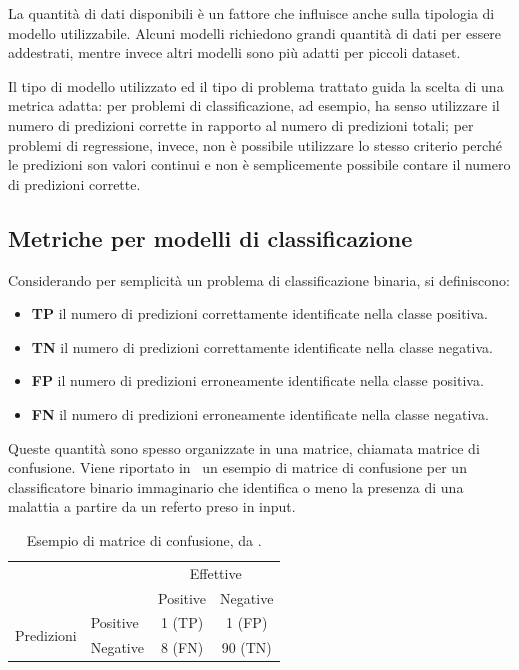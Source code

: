 La quantità di dati disponibili è un fattore che influisce anche sulla tipologia di modello utilizzabile.
Alcuni modelli richiedono grandi quantità di dati per essere addestrati, mentre invece altri modelli sono più adatti per piccoli dataset. 

Il tipo di modello utilizzato ed il tipo di problema trattato guida la scelta di una metrica adatta: per problemi di classificazione, ad esempio, ha senso utilizzare il numero di predizioni corrette in rapporto al numero di predizioni totali; per problemi di regressione, invece, non è possibile utilizzare lo stesso criterio perché le predizioni son valori continui e non è semplicemente possibile contare il numero di predizioni corrette. 

\subsection{Metriche per modelli di classificazione}\label{sec:metriche_valutazione_modelli}
Considerando per semplicità un problema di classificazione binaria, si definiscono:
\begin{itemize}
    \item \textbf{TP} il numero di predizioni correttamente identificate nella classe positiva.
    \item \textbf{TN} il numero di predizioni correttamente identificate nella classe negativa.
    \item \textbf{FP} il numero di predizioni erroneamente identificate nella classe positiva.
    \item \textbf{FN} il numero di predizioni erroneamente identificate nella classe negativa.
\end{itemize}
Queste quantità sono spesso organizzate in una matrice, chiamata matrice di confusione.
Viene riportato in~ un esempio di matrice di confusione per un classificatore binario immaginario che identifica o meno la presenza di una malattia a partire da un referto preso in input.
\begin{table}[h]
    \centering
    \begin{tabular}{l|l|c|c|}
        \multicolumn{2}{c}{}&\multicolumn{2}{c}{Effettive}\\
        \cline{3-4}
        \multicolumn{2}{c|}{} & Positive & Negative\\
        \cline{2-4}
        \multirow{2}{*}{Predizioni}& Positive & 1 (TP) & 1 (FP) \\
        \cline{2-4}
        & Negative & 8 (FN) & 90 (TN) \\
        \cline{2-4}
    \end{tabular}
    \caption{Esempio di matrice di confusione, da \protect\footnotemark.}
    \label{tab:matrice_confusione}
\end{table}


